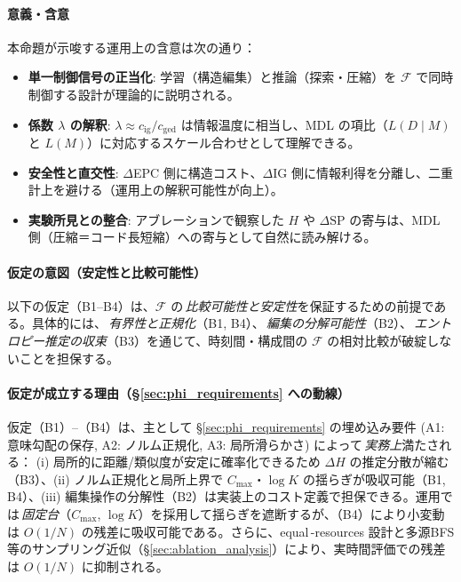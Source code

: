 \documentclass[ja=standard,xelatex]{bxjsarticle}
\newcommand{\F}{\mathcal{F}}
\begin{document}
\paragraph{意義・含意}
本命題が示唆する運用上の含意は次の通り：
\begin{itemize}[leftmargin=*]
  \item \textbf{単一制御信号の正当化}: 学習（構造編集）と推論（探索・圧縮）を $\F$ で同時制御する設計が理論的に説明される。
  \item \textbf{係数 $\lambda$ の解釈}: $\lambda\approx c_{\mathrm{ig}}/c_{\mathrm{ged}}$ は情報温度に相当し、MDL の項比（$L(D\mid M)$ と $L(M)$）に対応するスケール合わせとして理解できる。
  \item \textbf{安全性と直交性}: $\Delta$EPC 側に構造コスト、$\Delta$IG 側に情報利得を分離し、二重計上を避ける（運用上の解釈可能性が向上）。
  \item \textbf{実験所見との整合}: アブレーションで観察した $H$ や $\Delta\mathrm{SP}$ の寄与は、MDL 側（圧縮＝コード長短縮）への寄与として自然に読み解ける。
\end{itemize}

\paragraph{仮定の意図（安定性と比較可能性）}\; 以下の仮定（B1–B4）は、$\F$ の\,\emph{比較可能性と安定性}を保証するための前提である。具体的には、\,\emph{有界性と正規化}（B1, B4）、\,\emph{編集の分解可能性}（B2）、\,\emph{エントロピー推定の収束}（B3）を通じて、時刻間・構成間の $\F$ の相対比較が破綻しないことを担保する。

\paragraph{仮定が成立する理由（\S\ref{sec:phi_requirements} への動線）}
仮定（B1）–（B4）は、主として \S\ref{sec:phi_requirements} の埋め込み要件 (A1: 意味勾配の保存, A2: ノルム正規化, A3: 局所滑らかさ) によって\,\emph{実務上}満たされる： (i) 局所的に距離/類似度が安定に確率化できるため $\Delta H$ の推定分散が縮む（B3）、(ii) ノルム正規化と局所上界で $C_{\max}$・$\log K$ の揺らぎが吸収可能（B1, B4）、(iii) 編集操作の分解性（B2）は実装上のコスト定義で担保できる。運用では\,\emph{固定台}（$C_{\max}$, $\log K$）を採用して揺らぎを遮断するが、（B4）により小変動は $O(1/N)$ の残差に吸収可能である。さらに、equal\,\mbox{-}resources 設計と多源BFS等のサンプリング近似（\S\ref{sec:ablation_analysis}）により、実時間評価での残差は $O(1/N)$ に抑制される。
\end{document}
